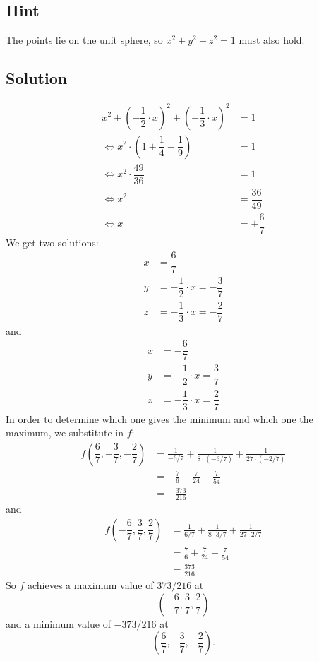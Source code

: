 \documentclass[a4paper,10pt]{article}
\begin{document}
\subsection{Hint}
The points lie on the unit sphere, so $x^2+y^2+z^2=1$ must also hold.

\subsection{Solution}
\begin{align*}
    x^2 + \left(-\dfrac{1}{2}\cdot x\right)^2 + \left(-\dfrac{1}{3}\cdot x\right)^2 & = 1                \\
    \iff x^2\cdot\left(1 + \dfrac{1}{4} + \dfrac{1}{9}\right)                       & = 1                \\
    \iff x^2\cdot \dfrac{49}{36}                                                    & = 1                \\
    \iff x^2                                                                        & = \dfrac{36}{49}   \\
    \iff x                                                                          & = \pm \dfrac{6}{7}
\end{align*}
We get two solutions:
\begin{align*}
    x & = \dfrac{6}{7}                          \\
    y & = -\dfrac{1}{2} \cdot x = -\dfrac{3}{7} \\
    z & = -\dfrac{1}{3} \cdot x = -\dfrac{2}{7}
\end{align*}
and
\begin{align*}
    x & =  -\dfrac{6}{7}                       \\
    y & = -\dfrac{1}{2} \cdot x = \dfrac{3}{7} \\
    z & = -\dfrac{1}{3} \cdot x = \dfrac{2}{7}
\end{align*}
In order to determine which one gives the minimum and which one the maximum, we substitute in $f$:
\begin{align*}
    f\left(\dfrac{6}{7}, -\dfrac{3}{7}, -\dfrac{2}{7}\right) & = \frac{1}{-6/7} + \frac{1}{8\cdot(-3/7)} + \frac{1}{27\cdot (-2/7)} \\
                                                             & = -\frac{7}{6} - \frac{7}{24} - \frac{7}{54}                         \\
                                                             & = -\frac{373}{216}
\end{align*}
and
\begin{align*}
    f\left(-\dfrac{6}{7}, \dfrac{3}{7}, \dfrac{2}{7}\right) & = \frac{1}{6/7} + \frac{1}{8\cdot 3/7} + \frac{1}{27\cdot 2/7} \\
                                                            & = \frac{7}{6} + \frac{7}{24} + \frac{7}{54}                    \\
                                                            & = \frac{373}{216}
\end{align*}
So $f$ achieves a maximum value of $373/216$ at
\[
    \left(-\dfrac{6}{7}, \dfrac{3}{7}, \dfrac{2}{7}\right)
\]
and a minimum value of $-373/216$ at
\[
    \left(\dfrac{6}{7}, -\dfrac{3}{7}, -\dfrac{2}{7}\right).
\]
\end{document}
